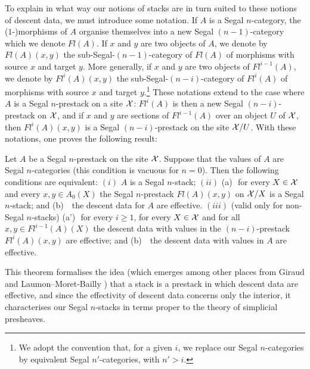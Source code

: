 To explain in what way our notions of stacks are in turn suited to these
notions of descent data, we must introduce some notation. If $A$ is a Segal
$n$-category, the ($1$-)morphisms of $A$ organise themselves into a new Segal
$(n-1)$-category which we denote $Fl(A)$. If $x$ and $y$ are two objects of
$A$, we denote by $Fl(A)(x,y)$ the sub-Segal-$(n-1)$-category of $Fl(A)$ of
morphisms with source $x$ and target $y$. More generally, if $x$ and $y$ are
two objects of $Fl^{i-1}(A)$, we denote by $Fl^{i}(A)(x,y)$ the
sub-Segal-$(n-i)$-category of $Fl^i(A)$ of morphisms with source $x$ and
target $y$.\footnote{We adopt the convention that, for a given $i$, we
replace our Segal $n$-categories by equivalent Segal $n'$-categories, with
$n'>i$.} These notations extend to the case where $A$ is a Segal $n$-prestack
on a site ${\cal X}$: $Fl^i(A)$ is then a new Segal $(n-i)$-prestack on ${\cal X}$,
and if $x$ and $y$ are sections of $Fl^{i-1}(A)$ over an object $U$ of
${\cal X}$, then $Fl^{i}(A)(x,y)$ is a Segal $(n-i)$-prestack on the site
${\cal X}/U$. With these notations, one proves the following result:
\begin{theorem}
Let $A$ be a Segal $n$-prestack on the site ${\cal X}$. Suppose that the values of
$A$ are Segal $n$-categories (this condition is vacuous for $n=0$). Then the
following conditions are equivalent:
\newline
$(i)$ $A$ is a Segal $n$-stack;
\newline
$(ii)$
(a)\,\, for every $X\in {\cal X}$ and every $x,y\in A_0(X)$ the Segal
$n$-prestack $Fl(A)(x,y)$ on ${\cal X} /X$ is a Segal $n$-stack; and
\newline
(b) \,\, the descent data for $A$ are effective.
\newline
$(iii)$ (valid only for non-Segal $n$-stacks)\newline
(a')\,\, for every $i \ge 1$, for every $X\in {\cal X}$ and for all
$x,y\in Fl^{i-1}(A)(X)$ the descent data with values in the
$(n-i)$-prestack $Fl^{i}(A)(x,y)$ are effective; and
\newline
(b) \,\, the descent data with values in $A$ are effective.
\end{theorem}

This theorem formalises the idea (which emerges among other places from Giraud
\cite{GiraudThese} and Laumon--Moret-Bailly \cite{LaumonMB}) that a stack is a
prestack in which descent data are effective, and since the effectivity of
descent data concerns only the interior, it characterises our Segal
$n$-stacks in terms proper to the theory of simplicial presheaves.

